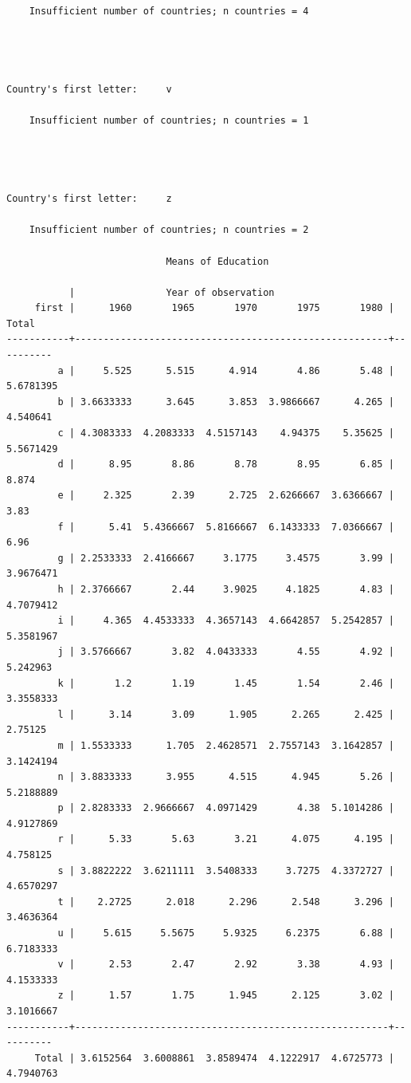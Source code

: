 \documentclass[
  12pt,
]{article}
\begin{document}
\begin{verbatim}
    Insufficient number of countries; n countries = 4




Country's first letter:     v

    Insufficient number of countries; n countries = 1




Country's first letter:     z

    Insufficient number of countries; n countries = 2

                            Means of Education

           |                Year of observation
     first |      1960       1965       1970       1975       1980 |     Total
-----------+-------------------------------------------------------+----------
         a |     5.525      5.515      4.914       4.86       5.48 | 5.6781395
         b | 3.6633333      3.645      3.853  3.9866667      4.265 |  4.540641
         c | 4.3083333  4.2083333  4.5157143    4.94375    5.35625 | 5.5671429
         d |      8.95       8.86       8.78       8.95       6.85 |     8.874
         e |     2.325       2.39      2.725  2.6266667  3.6366667 |      3.83
         f |      5.41  5.4366667  5.8166667  6.1433333  7.0366667 |      6.96
         g | 2.2533333  2.4166667     3.1775     3.4575       3.99 | 3.9676471
         h | 2.3766667       2.44     3.9025     4.1825       4.83 | 4.7079412
         i |     4.365  4.4533333  4.3657143  4.6642857  5.2542857 | 5.3581967
         j | 3.5766667       3.82  4.0433333       4.55       4.92 |  5.242963
         k |       1.2       1.19       1.45       1.54       2.46 | 3.3558333
         l |      3.14       3.09      1.905      2.265      2.425 |   2.75125
         m | 1.5533333      1.705  2.4628571  2.7557143  3.1642857 | 3.1424194
         n | 3.8833333      3.955      4.515      4.945       5.26 | 5.2188889
         p | 2.8283333  2.9666667  4.0971429       4.38  5.1014286 | 4.9127869
         r |      5.33       5.63       3.21      4.075      4.195 |  4.758125
         s | 3.8822222  3.6211111  3.5408333     3.7275  4.3372727 | 4.6570297
         t |    2.2725      2.018      2.296      2.548      3.296 | 3.4636364
         u |     5.615     5.5675     5.9325     6.2375       6.88 | 6.7183333
         v |      2.53       2.47       2.92       3.38       4.93 | 4.1533333
         z |      1.57       1.75      1.945      2.125       3.02 | 3.1016667
-----------+-------------------------------------------------------+----------
     Total | 3.6152564  3.6008861  3.8589474  4.1222917  4.6725773 | 4.7940763


\end{verbatim}
\end{document}
